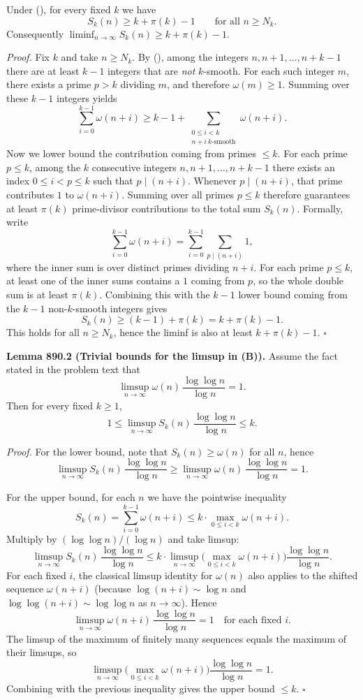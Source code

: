 \noindent Under (\*), for every fixed $k$ we have
\[
S_k(n) \ge k+\pi(k)-1\qquad\text{for all }n\ge N_k.
\]
Consequently $\liminf_{n\to\infty} S_k(n)\ge k+\pi(k)-1$.

\noindent \emph{Proof.}
Fix $k$ and take $n\ge N_k$.
By (\*), among the integers $n,n+1,\dots,n+k-1$ there are at least $k-1$ integers that are \emph{not} $k$-smooth. For each such integer $m$, there exists a prime $p>k$ dividing $m$, and therefore $\omega(m)\ge 1$.
Summing over these $k-1$ integers yields
\[
\sum_{i=0}^{k-1} \omega(n+i) \ge k-1 + \sum_{\substack{0\le i<k\\ n+i\ \text{$k$-smooth}}} \omega(n+i).
\]
Now we lower bound the contribution coming from primes $\le k$.
For each prime $p\le k$, among the $k$ consecutive integers $n,n+1,\dots,n+k-1$ there exists an index $0\le i<p\le k$ such that $p\mid(n+i)$.
Whenever $p\mid(n+i)$, that prime contributes $1$ to $\omega(n+i)$.
Summing over all primes $p\le k$ therefore guarantees at least $\pi(k)$ prime-divisor contributions to the total sum $S_k(n)$.
Formally, write
\[
\sum_{i=0}^{k-1} \omega(n+i) = \sum_{i=0}^{k-1} \sum_{p\mid(n+i)} 1,
\]
where the inner sum is over distinct primes dividing $n+i$. For each prime $p\le k$, at least one of the inner sums contains a $1$ coming from $p$, so the whole double sum is at least $\pi(k)$. Combining this with the $k-1$ lower bound coming from the $k-1$ non-$k$-smooth integers gives
\[
S_k(n)\ge (k-1)+\pi(k)=k+\pi(k)-1.
\]
This holds for all $n\ge N_k$, hence the liminf is also at least $k+\pi(k)-1$.
\hfill$\square$

\medskip
\noindent \textbf{Lemma 890.2 (Trivial bounds for the limsup in (B)).}
Assume the fact stated in the problem text that
\[
\limsup_{n\to\infty} \omega(n)\,\frac{\log\log n}{\log n}=1.
\]
Then for every fixed $k\ge 1$,
\[
1 \le \limsup_{n\to\infty} S_k(n)\,\frac{\log\log n}{\log n} \le k.
\]

\noindent \emph{Proof.}
For the lower bound, note that $S_k(n)\ge \omega(n)$ for all $n$, hence
\[
\limsup_{n\to\infty} S_k(n)\,\frac{\log\log n}{\log n}
\ge \limsup_{n\to\infty} \omega(n)\,\frac{\log\log n}{\log n}=1.
\]

For the upper bound, for each $n$ we have the pointwise inequality
\[
S_k(n)=\sum_{i=0}^{k-1}\omega(n+i) \le k\cdot \max_{0\le i<k}\omega(n+i).
\]
Multiply by $(\log\log n)/(\log n)$ and take limsup:
\[
\limsup_{n\to\infty} S_k(n)\,\frac{\log\log n}{\log n}
\le k\cdot \limsup_{n\to\infty} \Big(\max_{0\le i<k}\omega(n+i)\Big)\frac{\log\log n}{\log n}.
\]
For each fixed $i$, the classical limsup identity for $\omega(n)$ also applies to the shifted sequence $\omega(n+i)$ (because $\log(n+i)\sim \log n$ and $\log\log(n+i)\sim \log\log n$ as $n\to\infty$).
Hence
\[
\limsup_{n\to\infty} \omega(n+i)\,\frac{\log\log n}{\log n}=1\quad\text{for each fixed }i.
\]
The limsup of the maximum of finitely many sequences equals the maximum of their limsups, so
\[
\limsup_{n\to\infty} \Big(\max_{0\le i<k}\omega(n+i)\Big)\frac{\log\log n}{\log n} = 1.
\]
Combining with the previous inequality gives the upper bound $\le k$.
\hfill$\square$

